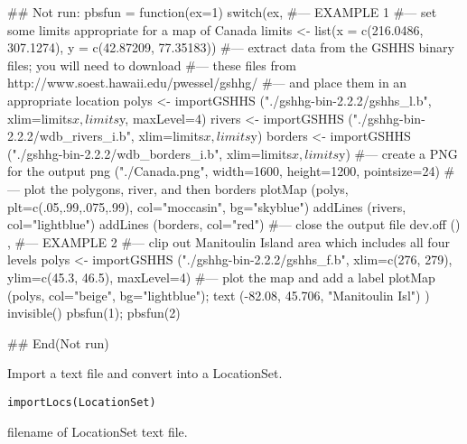 \documentclass[letterpaper]{book}
\begin{document}
\begin{Examples}
\begin{ExampleCode}
## Not run: 
pbsfun = function(ex=1) {
  switch(ex, {
  #--- EXAMPLE 1
  #--- set some limits appropriate for a map of Canada
  limits <- list(x = c(216.0486, 307.1274), y = c(42.87209, 77.35183))
  #--- extract data from the GSHHS binary files; you will need to download
  #--- these files from http://www.soest.hawaii.edu/pwessel/gshhg/
  #--- and place them in an appropriate location
  polys <- importGSHHS ("./gshhg-bin-2.2.2/gshhs_l.b",
                   xlim=limits$x, limits$y, maxLevel=4)
  rivers <- importGSHHS ("./gshhg-bin-2.2.2/wdb_rivers_i.b",
                         xlim=limits$x, limits$y)
  borders <- importGSHHS ("./gshhg-bin-2.2.2/wdb_borders_i.b",
                          xlim=limits$x, limits$y)
  #--- create a PNG for the output
  png ("./Canada.png", width=1600, height=1200, pointsize=24)
  #--- plot the polygons, river, and then borders
  plotMap (polys, plt=c(.05,.99,.075,.99), col="moccasin", bg="skyblue")
  addLines (rivers, col="lightblue")
  addLines (borders, col="red")
  #--- close the output file
  dev.off ()
  },{
  #--- EXAMPLE 2
  #--- clip out Manitoulin Island area which includes all four levels
  polys <- importGSHHS ("./gshhg-bin-2.2.2/gshhs_f.b",
                        xlim=c(276, 279), ylim=c(45.3, 46.5), maxLevel=4)
  #--- plot the map and add a label
  plotMap (polys, col="beige", bg="lightblue");
  text (-82.08, 45.706, "Manitoulin Isl")
  })
  invisible()
}
pbsfun(1); pbsfun(2)

## End(Not run)
\end{ExampleCode}
\end{Examples}
%
\begin{Description}\relax
Import a text file and convert into a LocationSet.
\end{Description}
%
\begin{Usage}
\begin{verbatim}
importLocs(LocationSet)
\end{verbatim}
\end{Usage}
%
\begin{Arguments}
\begin{ldescription}
\item[\code{LocationSet}] filename of LocationSet text file.
\end{ldescription}
\end{Arguments}
\end{document}
